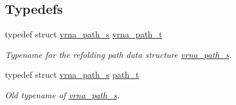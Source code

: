 \subsection*{Typedefs}
\begin{DoxyCompactItemize}
\item 
typedef struct \mbox{\hyperlink{group__direct__paths_structvrna__path__s}{vrna\+\_\+path\+\_\+s}} \mbox{\hyperlink{group__direct__paths_ga818d4f3d1cf8723d6905990b08d909fe}{vrna\+\_\+path\+\_\+t}}
\begin{DoxyCompactList}\small\item\em Typename for the refolding path data structure \mbox{\hyperlink{group__direct__paths_structvrna__path__s}{vrna\+\_\+path\+\_\+s}}. \end{DoxyCompactList}\item 
typedef struct \mbox{\hyperlink{group__direct__paths_structvrna__path__s}{vrna\+\_\+path\+\_\+s}} \mbox{\hyperlink{group__direct__paths_gab6b8737d5377e70a7815d04aae7fd884}{path\+\_\+t}}
\begin{DoxyCompactList}\small\item\em Old typename of \mbox{\hyperlink{group__direct__paths_structvrna__path__s}{vrna\+\_\+path\+\_\+s}}. \end{DoxyCompactList}\end{DoxyCompactItemize}
